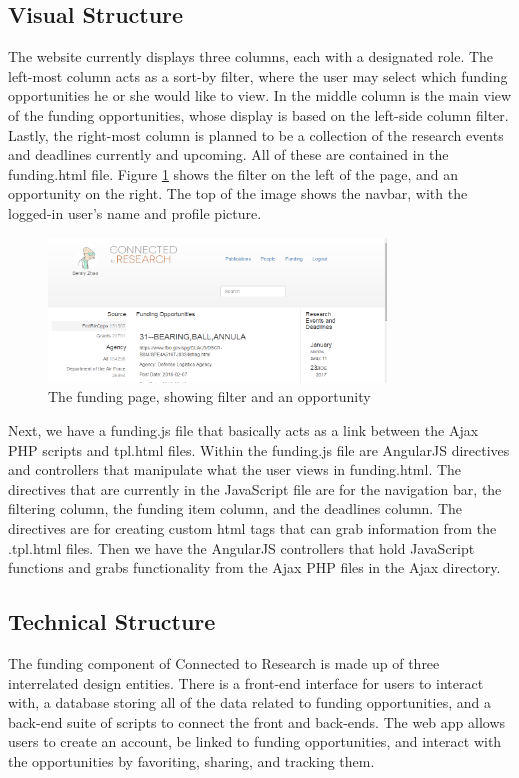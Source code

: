 \documentclass[onecolumn]{IEEEtran}
\begin{document}
\subsection{Visual Structure}
The website currently displays three columns, each with a designated role. The left-most column acts as a sort-by filter, where the user may select which funding opportunities he or she would like to view. In the middle column is the main view of the funding opportunities, whose display is based on the left-side column filter. Lastly, the right-most column is planned to be a collection of the research events and deadlines currently and upcoming. All of these are contained in the funding.html file. Figure \ref{fig:filter} shows the filter on the left of the page, and an opportunity on the right. The top of the image shows the navbar, with the logged-in user's name and profile picture.  

\begin{figure}
    \centering
    \includegraphics[width=0.8\textwidth]{filter.png}
    \caption{The funding page, showing filter and an opportunity}
    \label{fig:filter}
\end{figure}

Next, we have a funding.js file that basically acts as a link between the Ajax PHP scripts and tpl.html files. Within the funding.js file are AngularJS directives and controllers that manipulate what the user views in funding.html. The directives that are currently in the JavaScript file are for the navigation bar, the filtering column, the funding item column, and the deadlines column. The directives are for creating custom html tags that can grab information from the .tpl.html files. Then we have the AngularJS controllers that hold JavaScript functions and grabs functionality from the Ajax PHP files in the Ajax directory. 

\subsection{Technical Structure}
The funding component of Connected to Research is made up of three interrelated design entities. There is a front-end interface for users to interact with, a database storing all of the data related to funding opportunities, and a back-end suite of scripts to connect the front and back-ends. The web app allows users to create an account, be linked to funding opportunities, and interact with the opportunities by favoriting, sharing, and tracking them.  
\end{document}
